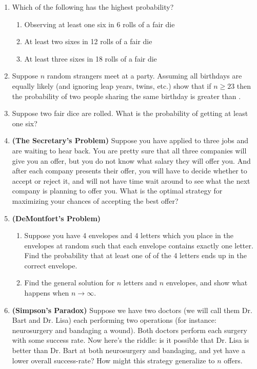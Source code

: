 \documentclass{report}
\begin{document}
\begin{enumerate}
    \item Which of the following has the highest probability?
    \begin{enumerate}
        \item Observing at least one six in 6 rolls of a fair die
        \item At least two sixes in 12 rolls of a fair die
        \item At least three sixes in 18 rolls of a fair die
    \end{enumerate}
    \item Suppose $n$ random strangers meet at a party. Assuming all birthdays are equally likely (and ignoring leap years, twins, etc.) show that if $n\ge 23$ then the probability of two people sharing the same birthday is greater than .
    \item Suppose two fair dice are rolled. What is the probability of getting at least one six?
    \item\textbf{(The Secretary's Problem)}
    Suppose you have applied to three jobs and are waiting to hear back. You are pretty sure that all three companies will give you an offer, but you do not know what salary they will offer you. And after each company presents their offer, you will have to decide whether to accept or reject it, and will not have time wait around to see what the next company is planning to offer you. What is the optimal strategy for maximizing your chances of accepting the best offer?
    \item \textbf{(DeMontfort's Problem)} 
    \begin{enumerate}
        \item Suppose you have 4 envelopes and 4 letters which you place in the envelopes at random such that each envelope contains exactly one letter. Find the probability that at least one of of the 4 letters ends up in the correct envelope.
        \item Find the general solution for $n$ letters and $n$ envelopes, and show what happens when $n\to\infty$.
    \end{enumerate}
    \item \textbf{(Simpson's Paradox)} Suppose we have two doctors (we will call them Dr. Bart and Dr. Lisa) each performing two operations (for instance: neurosurgery and bandaging a wound). Both doctors perform each surgery with some success rate. Now here's the riddle: is it possible that Dr. Lisa is better than Dr. Bart at both neurosurgery and bandaging, and yet have a lower overall success-rate? How might this strategy generalize to $n$ offers.
\end{enumerate}
\end{document}
